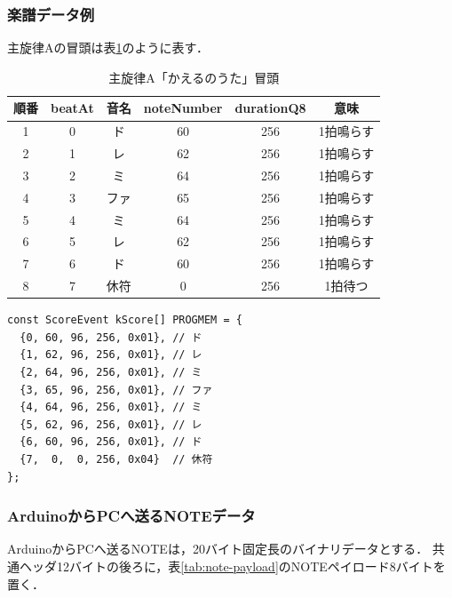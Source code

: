 \documentclass[lualatex,book,paper=a4paper,jafontsize=11.5pt,jafontscale=1.05]{jlreq}
\begin{document}
\subsubsection{楽譜データ例}

主旋律Aの冒頭は表\ref{tab:melody}のように表す．

\begin{table}[H]
\centering
\caption{主旋律A「かえるのうた」冒頭}
\label{tab:melody}
\begin{tabular}{cccccc}
\toprule
\textbf{順番} & \textbf{beatAt} & \textbf{音名} & \textbf{noteNumber} & \textbf{durationQ8} & \textbf{意味} \\
\midrule
1 & 0 & ド & 60 & 256 & 1拍鳴らす \\
2 & 1 & レ & 62 & 256 & 1拍鳴らす \\
3 & 2 & ミ & 64 & 256 & 1拍鳴らす \\
4 & 3 & ファ & 65 & 256 & 1拍鳴らす \\
5 & 4 & ミ & 64 & 256 & 1拍鳴らす \\
6 & 5 & レ & 62 & 256 & 1拍鳴らす \\
7 & 6 & ド & 60 & 256 & 1拍鳴らす \\
8 & 7 & 休符 & 0 & 256 & 1拍待つ \\
\bottomrule
\end{tabular}
\end{table}

\begin{verbatim}
const ScoreEvent kScore[] PROGMEM = {
  {0, 60, 96, 256, 0x01}, // ド
  {1, 62, 96, 256, 0x01}, // レ
  {2, 64, 96, 256, 0x01}, // ミ
  {3, 65, 96, 256, 0x01}, // ファ
  {4, 64, 96, 256, 0x01}, // ミ
  {5, 62, 96, 256, 0x01}, // レ
  {6, 60, 96, 256, 0x01}, // ド
  {7,  0,  0, 256, 0x04}  // 休符
};
\end{verbatim}

\subsubsection{ArduinoからPCへ送るNOTEデータ}

ArduinoからPCへ送るNOTEは，20バイト固定長のバイナリデータとする．
共通ヘッダ12バイトの後ろに，表\ref{tab:note-payload}のNOTEペイロード8バイトを置く．
\end{document}
